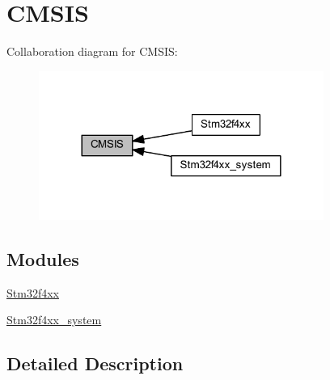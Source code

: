 \hypertarget{group___c_m_s_i_s}{}\section{C\+M\+S\+IS}
\label{group___c_m_s_i_s}
Collaboration diagram for C\+M\+S\+IS\+:\nopagebreak
\begin{figure}[H]
\begin{center}
\leavevmode
\includegraphics[width=264pt]{group___c_m_s_i_s}
\end{center}
\end{figure}
\subsection*{Modules}
\begin{DoxyCompactItemize}
\item 
\hyperlink{group__stm32f4xx}{Stm32f4xx}
\item 
\hyperlink{group__stm32f4xx__system}{Stm32f4xx\+\_\+system}
\end{DoxyCompactItemize}


\subsection{Detailed Description}
